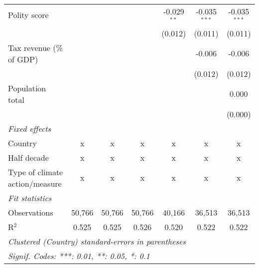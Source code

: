 \begin{tabular}{lcccccc}
   Polity score                                                        &         &               &               & -0.029$^{**}$ & -0.035$^{***}$ & -0.035$^{***}$\\   
                                                                       &         &               &               & (0.012)       & (0.011)        & (0.011)\\   
   Tax revenue (\% of GDP)                                             &         &               &               &               & -0.006         & -0.006\\   
                                                                       &         &               &               &               & (0.012)        & (0.012)\\   
   Population total                                                    &         &               &               &               &                & 0.000\\   
                                                                       &         &               &               &               &                & (0.000)\\   
   \emph{Fixed effects}\\
   Country                                                             & x       & x             & x             & x             & x              & x\\  
   Half decade                                                         & x       & x             & x             & x             & x              & x\\  
   Type of climate action/measure                                      & x       & x             & x             & x             & x              & x\\  
   \midrule \emph{Fit statistics}\\
   Observations                                                        & 50,766  & 50,766        & 50,766        & 40,166        & 36,513         & 36,513\\  
   R$^2$                                                               & 0.525   & 0.525         & 0.526         & 0.520         & 0.522          & 0.522\\  
   \midrule
   \multicolumn{7}{l}{\emph{Clustered (Country) standard-errors in parentheses}}\\
   \multicolumn{7}{l}{\emph{Signif. Codes: ***: 0.01, **: 0.05, *: 0.1}}\\
\end{tabular}
\par\endgroup


